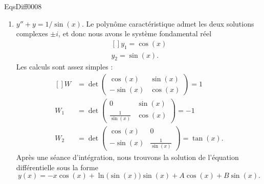 \begin{corrige}{EqsDiff0008}
\begin{enumerate}
\item
$y''+y=1/\sin(x)$. Le polynôme caractéristique admet les deux solutions complexes $\pm i$, et donc nous avons le système fondamental réel
\begin{equation}
	\begin{aligned}[]
		y_1=\cos(x)\\
		y_2=\sin(x).
	\end{aligned}
\end{equation}
Les calculs sont assez simples :
\begin{equation}
	\begin{aligned}[]
		W&=\det\begin{pmatrix}
	\cos(x)	&	\sin(x)	\\ 
	-\sin(x)	&	\cos(x)	
\end{pmatrix}=1\\
		W_1&=\det\begin{pmatrix}
	0	&	\sin(x)	\\ 
	\frac{1}{ \sin(x) }	&	\cos(x)	
\end{pmatrix}=-1\\
		W_2&=\det\begin{pmatrix}
	\cos(x)	&	0	\\ 
	-\sin(x)	&	\frac{1}{ \sin(x) }
\end{pmatrix}=\tan(x).
	\end{aligned}
\end{equation}
Après une séance d'intégration, nous trouvons la solution de l'équation différentielle sous la forme
\begin{equation}
	y(x)=-x\cos(x)+\ln\big( \sin(x) \big)\sin(x)+A\cos(x)+B\sin(x).
\end{equation}


\end{enumerate}
\end{corrige}
